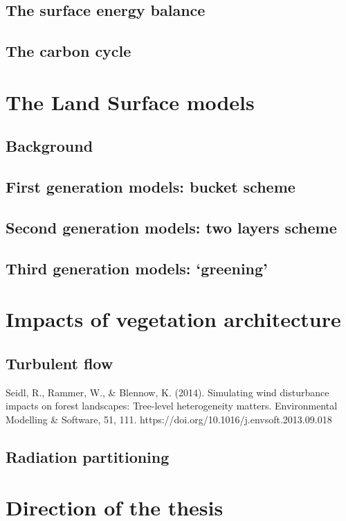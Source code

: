 \subsection{The surface energy balance}

\subsection{The carbon cycle}

\section{The Land Surface models}

\subsection{Background}

\subsection{First generation models: bucket scheme}

\subsection{Second generation models: two layers scheme}

\subsection{Third generation models: `greening'}

\section{Impacts of vegetation architecture}

\subsection{Turbulent flow}

Seidl, R., Rammer, W., & Blennow, K. (2014). Simulating wind disturbance impacts on forest landscapes: Tree-level heterogeneity matters. Environmental Modelling & Software, 51, 111. https://doi.org/10.1016/j.envsoft.2013.09.018

\subsection{Radiation partitioning}

\section{Direction of the thesis}

